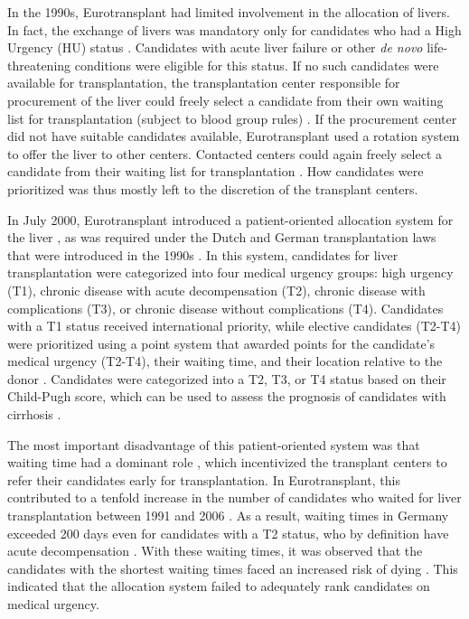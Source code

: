 \documentclass[11pt,twoside,]{book}
\begin{document}
In the 1990s, Eurotransplant had limited involvement in the allocation of livers.
In fact, the exchange of livers was mandatory only
for candidates who had a High Urgency
(HU) status \citep{HaaseKromwijk1999}. Candidates with acute liver failure or other
\emph{de novo} life-threatening conditions were eligible for this status. If
no such candidates were available for transplantation, the transplantation
center responsible for procurement of the liver could freely select a candidate
from their own waiting list for transplantation (subject to blood group rules) \citep{demeesterWhichABOmatchingRule2002}. If the procurement center did not have
suitable candidates available, Eurotransplant used a rotation system to
offer the liver to other centers. Contacted centers could again freely select
a candidate from their waiting list for transplantation \citep{Jost1997, Chapman1997}.
How candidates were prioritized was thus mostly left to the discretion of
the transplant centers.

In July 2000, Eurotransplant introduced a patient-oriented allocation system
for the liver \citep{Strassburg2004}, as was required under the Dutch and
German transplantation laws that were introduced in the 1990s \citep{HaaseKromwijk1999}. In this system, candidates for liver
transplantation were categorized into four medical urgency groups: high urgency
(T1), chronic disease with acute decompensation (T2), chronic disease with
complications (T3), or chronic disease without complications (T4). Candidates
with a T1 status received international priority, while elective candidates (T2-T4) were prioritized
using a point system that awarded points for the candidate's medical urgency (T2-T4), their waiting time, and their location relative to the donor \citep{minutesELIACMeeting2002}.
Candidates were categorized into a T2, T3, or T4 status based on their Child-Pugh
score, which can be used to assess the prognosis of candidates with cirrhosis \citep{Strassburg2004, Jung2008}.

The most important disadvantage of this patient-oriented system was that waiting
time had a dominant role \citep{Strassburg2004, Jung2008}, which incentivized the
transplant centers to refer their candidates early for transplantation. In Eurotransplant,
this contributed to a tenfold increase in the number of candidates who
waited for liver transplantation between 1991 and 2006 \citep{Jung2008}. As a result,
waiting times in Germany exceeded 200 days even for candidates with a T2 status,
who by definition have acute decompensation \citep{Strassburg2004}. With
these waiting times, it was observed that the candidates with the shortest
waiting times faced an increased risk of dying \citep{minutesELIACMeeting2002}. This
indicated that the allocation system failed to adequately rank candidates on
medical urgency.
\end{document}
